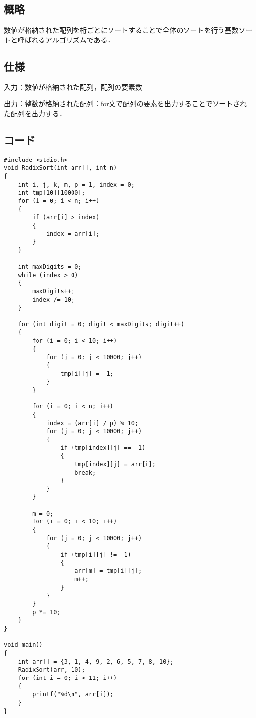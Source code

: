 \documentclass{ltjsarticle}
\begin{document}
\subsection{概略}
数値が格納された配列を桁ごとにソートすることで全体のソートを行う基数ソートと呼ばれるアルゴリズムである．

\subsection{仕様}
\noindent 入力：数値が格納された配列，配列の要素数

\noindent 出力：整数が格納された配列：for文で配列の要素を出力することでソートされた配列を出力する．
\subsection{コード}

\begin{lstlisting}[frame=single, lineskip=-5pt]
#include <stdio.h>
void RadixSort(int arr[], int n)
{
    int i, j, k, m, p = 1, index = 0;
    int tmp[10][10000];
    for (i = 0; i < n; i++)
    {
        if (arr[i] > index)
        {
            index = arr[i];
        }
    }

    int maxDigits = 0;
    while (index > 0)
    {
        maxDigits++;
        index /= 10;
    }

    for (int digit = 0; digit < maxDigits; digit++)
    {
        for (i = 0; i < 10; i++)
        {
            for (j = 0; j < 10000; j++)
            {
                tmp[i][j] = -1;
            }
        }

        for (i = 0; i < n; i++)
        {
            index = (arr[i] / p) % 10;
            for (j = 0; j < 10000; j++)
            {
                if (tmp[index][j] == -1)
                {
                    tmp[index][j] = arr[i];
                    break;
                }
            }
        }

        m = 0;
        for (i = 0; i < 10; i++)
        {
            for (j = 0; j < 10000; j++)
            {
                if (tmp[i][j] != -1)
                {
                    arr[m] = tmp[i][j];
                    m++;
                }
            }
        }
        p *= 10;
    }
}

void main()
{
    int arr[] = {3, 1, 4, 9, 2, 6, 5, 7, 8, 10};
    RadixSort(arr, 10);
    for (int i = 0; i < 11; i++)
    {
        printf("%d\n", arr[i]);
    }
}
\end{lstlisting}
\end{document}
